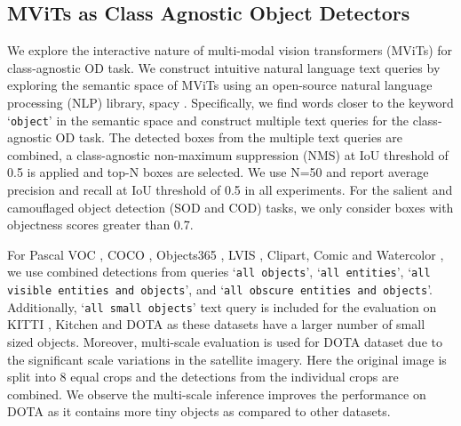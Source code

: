 \documentclass[runningheads]{llncs}
\newcommand{\txt}[1]{{\texttt{#1}}}
\begin{document}
\begin{table}[!ht]
\caption{Comparison of MDETR \cite{mdetr} and MAVL (ours) in terms of convergence epochs, parameters, inference speed and class-agnostic OD performance on COCO \cite{coco} dataset. MAVL converges in half epochs with better accuracy at the cost of slightly slower inference. The frames per second (FPS) are measured on a Quadro RTX 6000 GPU by averaging the time for $1K$ inference passes.}
\begin{center}
\end{center}
\label{table:mdetr_vs_mdef_detr}
\end{table}
\subsection{MViTs as Class Agnostic Object Detectors}
\label{appendix:class_agnostic_evaluation}
We explore the interactive nature of multi-modal vision transformers (MViTs) for class-agnostic OD task. We construct intuitive natural language text queries by exploring the semantic space of MViTs using an open-source natural language processing (NLP) library, spacy \cite{spacy}. Specifically, we find words closer to the keyword ‘\txt{object}’ in the semantic space and construct multiple text queries for the class-agnostic OD task. The detected boxes from the multiple text queries are combined, a class-agnostic non-maximum suppression (NMS) at IoU threshold of 0.5 is applied and top-N boxes are selected. We use N=50 and report average precision and recall at IoU threshold of 0.5 in all experiments. For the salient and camouflaged object detection (SOD and COD) tasks, we only consider boxes with objectness scores greater than 0.7.

For Pascal VOC \cite{voc}, COCO \cite{coco}, Objects365 \cite{shao2019objects365}, LVIS \cite{gupta2019lvis}, Clipart, Comic and Watercolor \cite{clipart-comic-water}, we use combined detections from queries ‘\txt{all objects}’, ‘\txt{all entities}’, ‘\txt{all visible entities and objects}’, and ‘\txt{all obscure entities and objects}’. Additionally, ‘\txt{all small objects}’ text query is included for the evaluation on KITTI \cite{kitti}, Kitchen \cite{kitchen} and DOTA \cite{dota} as these datasets have a larger number of small sized objects. Moreover, multi-scale evaluation is used for DOTA dataset due to the significant scale variations in the satellite imagery. Here the original image is split into 8 equal crops and the detections from the individual crops are combined. We observe the multi-scale inference improves the performance on DOTA as it contains more tiny objects as compared to other datasets.
\end{document}
